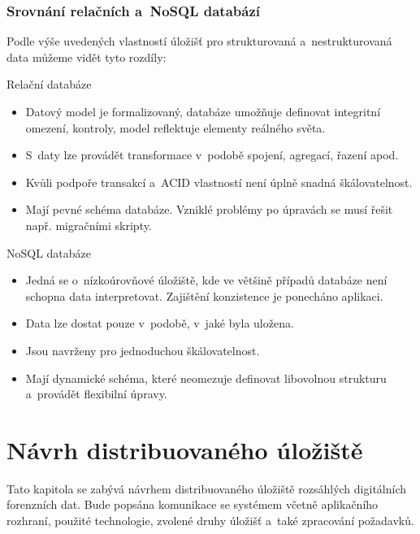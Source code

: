 \subsection{Srovnání relačních a~NoSQL databází}
Podle výše uvedených vlastností úložišť pro strukturovaná a~nestrukturovaná data můžeme vidět tyto rozdíly:

\begin{multicols}{2}

Relační databáze

\begin{itemize}
    \item Datový model je formalizovaný, databáze umožňuje definovat integritní omezení, kontroly, model reflektuje elementy reálného světa.
    
    \item S~daty lze provádět transformace v~podobě spojení, agregací, řazení apod.
    
    \item Kvůli podpoře transakcí a~ACID vlastností není úplně snadná škálovatelnost.
    
    \item Mají pevné schéma databáze. Vzniklé problémy po úpravách se musí řešit např. migračními skripty.
\end{itemize}

\columnbreak

NoSQL databáze

\begin{itemize}
    \item Jedná se o~nízkoúrovňové úložiště, kde ve většině případů databáze není schopna data interpretovat. Zajištění konzistence je ponecháno aplikaci. 
    
    \item Data lze dostat pouze v~podobě, v~jaké byla uložena.
    
    \item Jsou navrženy pro jednoduchou škálovatelnost.
    
    \item Mají dynamické schéma, které neomezuje definovat libovolnou strukturu a~provádět flexibilní úpravy.
\end{itemize}

\end{multicols}

\chapter{Návrh distribuovaného úložiště} \label{distrRepDesignChapter}
Tato kapitola se zabývá návrhem distribuovaného úložiště rozsáhlých digitálních forenzních dat. Bude popsána komunikace se systémem včetně aplikačního rozhraní, použité technologie, zvolené druhy úložišť a~také zpracování požadavků.


